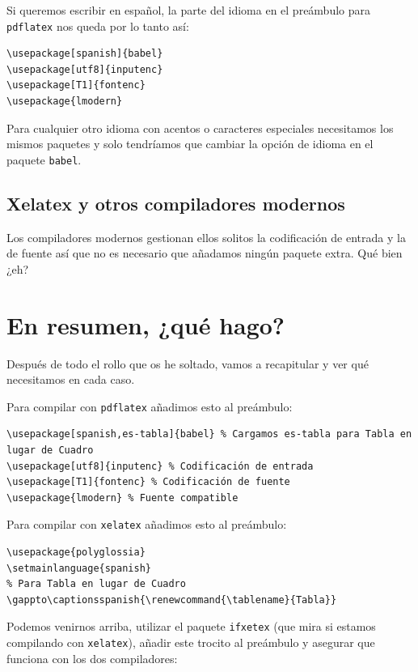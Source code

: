 Si queremos escribir en español, la parte del idioma en el preámbulo
para \lstinline!pdflatex! nos queda por lo tanto así:

\begin{lstlisting}[language={[latex]tex}]
\usepackage[spanish]{babel}
\usepackage[utf8]{inputenc} 
\usepackage[T1]{fontenc}
\usepackage{lmodern}
\end{lstlisting}

Para cualquier otro idioma con acentos o caracteres especiales
necesitamos los mismos paquetes y solo tendríamos que cambiar la opción
de idioma en el paquete \lstinline!babel!.

\subsection{Xelatex y otros compiladores
modernos}\label{sec:xelatex}

Los compiladores modernos gestionan ellos solitos la codificación de
entrada y la de fuente así que no es necesario que añadamos ningún
paquete extra. Qué bien ¿eh?

\section{En resumen, ¿qué hago?}\label{sec:resumen6}

Después de todo el rollo que os he soltado, vamos a recapitular y ver
qué necesitamos en cada caso.

Para compilar con \lstinline!pdflatex! añadimos esto al preámbulo:

\begin{lstlisting}[language={[latex]tex}]
\usepackage[spanish,es-tabla]{babel} % Cargamos es-tabla para Tabla en lugar de Cuadro
\usepackage[utf8]{inputenc} % Codificación de entrada
\usepackage[T1]{fontenc} % Codificación de fuente
\usepackage{lmodern} % Fuente compatible
\end{lstlisting}

Para compilar con \lstinline!xelatex! añadimos esto al preámbulo:

\begin{lstlisting}[language={[latex]tex}]
\usepackage{polyglossia}
\setmainlanguage{spanish}
% Para Tabla en lugar de Cuadro
\gappto\captionsspanish{\renewcommand{\tablename}{Tabla}} 
\end{lstlisting}

Podemos venirnos arriba, utilizar el paquete \lstinline!ifxetex! (que mira si
estamos compilando con \lstinline!xelatex!), añadir este trocito al preámbulo y
asegurar que funciona con los dos compiladores:


